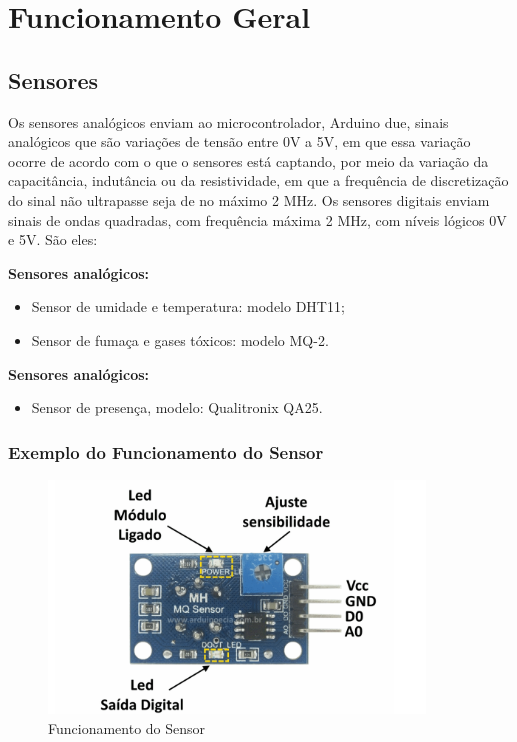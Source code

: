 \chapter{Funcionamento Geral}

\section{Sensores}
\par Os sensores analógicos enviam ao microcontrolador, Arduino due, sinais analógicos que são variações de tensão entre 0V a 5V, em que essa variação ocorre de acordo com o que o sensores está captando, por meio da variação da capacitância, indutância ou da resistividade, em que a frequência de discretização do sinal não ultrapasse  seja de no máximo 2 MHz. Os sensores digitais enviam sinais de ondas quadradas, com frequência máxima 2 MHz, com níveis lógicos 0V e 5V. São eles:
\par \textbf{Sensores analógicos:}
    \begin{itemize}
        \item Sensor de umidade e temperatura: modelo DHT11;
        \item Sensor de fumaça e gases tóxicos: modelo MQ-2.
    \end{itemize}
\par \textbf{Sensores analógicos:}
    \begin{itemize}
        \item Sensor de presença, modelo: Qualitronix QA25.
    \end{itemize}

\subsection{Exemplo do Funcionamento do Sensor}

\begin{figure}[!h]
\caption{Funcionamento do Sensor}
\centering
\includegraphics[width=10cm]{figuras/funcionamento}
\end{figure}

